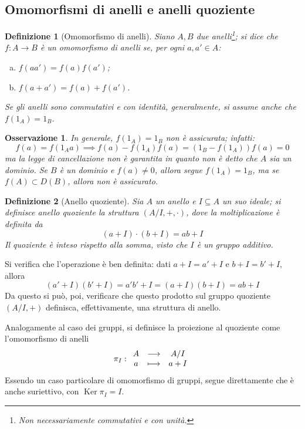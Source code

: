 \documentclass[12pt]{scrartcl}
\theoremstyle{style}
\newtheorem{definizione}{Definizione}[section]
\newtheorem{osservazione}{Osservazione}[section]
\numberwithin{equation}{subsection}
\begin{document}
\subsection{Omomorfismi di anelli e anelli quoziente}
\begin{definizione}
	[Omomorfismo di anelli]
	Siano $A ,B$ due anelli\footnote{Non necessariamente commutativi e con unit\`a.}; si dice che $f : A \to B$ \`e un omomorfismo di anelli se, per ogni $a,a' \in A$:
	\begin{enumerate}[(a).]
		\item$f(aa') = f(a)f(a')$;
		\item $f(a+a') = f(a) + f(a')$.
	\end{enumerate}
	Se gli anelli sono commutativi e con identit\`a, generalmente, si assume anche che $f(1_A) = 1_B$.
\end{definizione}
\begin{osservazione}
In generale, $f(1_A) = 1_B$ non \`e assicurata; infatti:
\[
f(a) = f(1_A a) \implies f(a) - f(1_A) f(a) = (1_B - f(1_A))f(a) = 0
\] 
ma la legge di cancellazione non \`e garantita in quanto non \`e detto che $A$ sia un dominio. 
Se $B$ \`e un dominio e $f(a) \neq 0$, allora segue $f(1_A) = 1_B$, ma se $f(A) \subset D(B)$, allora non \`e assicurato.
\end{osservazione}
\begin{definizione}
	[Anello quoziente]
	Sia $A$ un anello e $I \subseteq A$ un suo ideale; si definisce \textit{anello quoziente} la struttura $(A / I, +, \cdot )$, dove la moltiplicazione \`e definita da
	\[
		(a+I)\cdot (b+I) = ab + I
	\] 
	Il quoziente \`e inteso rispetto alla somma, visto che $I$ \`e un gruppo additivo.
\end{definizione}
\noindent Si verifica che l'operazione \`e ben definita: dati $a+I = a'+I$ e $b+I = b'+I$, allora
\[
	(a'+I)(b'+I) = a'b' + I = (a+I)(b+I) = ab + I 
\] 
Da questo si pu\`o, poi, verificare che questo prodotto sul gruppo quoziente $(A/I, +)$ definisca, effettivamente, una struttura di anello.

Analogamente al caso dei gruppi, si definisce la proiezione al quoziente come l'omomorfismo di anelli
\begin{equation}
	\pi _I : 
	\begin{array}
		{c c c}
		A &\longrightarrow & A / I\\
		a&\longmapsto & a + I 
	\end{array}
\end{equation}
Essendo un caso particolare di omomorfismo di gruppi, segue direttamente che \`e anche suriettivo, con $\operatorname{Ker} \pi_I = I $.
\end{document}
